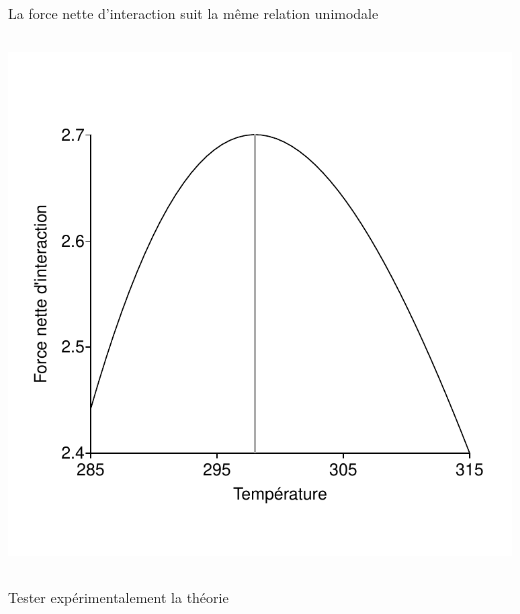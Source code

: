 \documentclass[11pt, compress, aspectratio=1610]{beamer}
\newcommand{\begincols}{\begin{columns}}
\newcommand{\stopcols}{\end{columns}}
\begin{document}
\begin{frame}{La force nette d'interaction suit la même relation
unimodale}

\begincols
  \centering
\centering  \includegraphics[width=1\linewidth]{figuresAz/NetIS.pdf}

\stopcols

\end{frame}

\begin{frame}{Tester expérimentalement la théorie}

\centering
\par

\end{frame}
\end{document}
